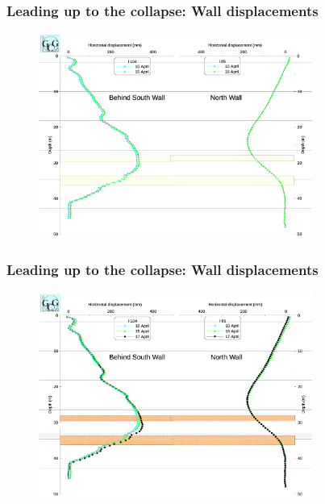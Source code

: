 \documentclass[handout]{beamer}
\begin{document}
\begin{frame}
\frametitle{Leading up to the collapse: Wall displacements}
\begin{figure}[ht]
\centering
\includegraphics[width=0.8\textwidth]{figs/disp2.png}
\end{figure}
\end{frame}

\begin{frame}
\frametitle{Leading up to the collapse: Wall displacements}
\begin{figure}[ht]
	\centering
	\includegraphics[width=0.8\textwidth]{figs/disp3.png}
\end{figure}
\end{frame}
\end{document}
